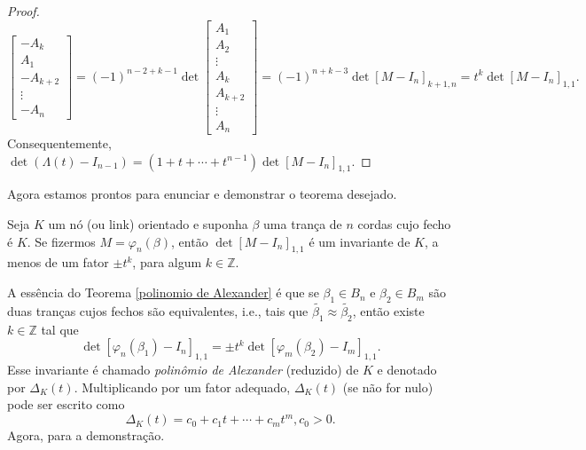 \begin{proof}
\begin{equation*}
\begin{bmatrix}
    		-A_k\\
    		A_1\\
    		-A_{k+2}\\
    		\vdots\\
    		-A_n
    		\end{bmatrix} = (-1)^{n-2+k-1}\det\begin{bmatrix}
    		A_1\\
    		A_2\\
    		\vdots\\
    		A_k\\
    		A_{k+2}\\
    		\vdots\\
    		A_n
    		\end{bmatrix} = (-1)^{n+k-3}\det[M - I_n]_{k+1, n} = t^k\det[M - I_n]_{1,1}.
		\end{equation*}
		Consequentemente, $\det(\Lambda(t) - I_{n-1}) = (1+t+\cdots+t^{n-1})\det[M - I_n]_{1,1}$.	
	\end{proof}
	Agora estamos prontos para enunciar e demonstrar o teorema desejado.
	\begin{theorem}
	\label{polinomio de Alexander}
		Seja $K$ um nó (ou link) orientado e suponha $\beta$ uma trança de $n$ cordas cujo fecho é $K$. 
		Se fizermos $M = \varphi_n(\beta)$, então $\det[M - I_n]_{1,1}$ é um invariante de $K$, 
		a menos de um fator $\pm t^k$, para algum $k\in\mathbb{Z}$.
	\end{theorem}
	A essência do Teorema \ref{polinomio de Alexander} é que se $\beta_1\in B_n$ e $\beta_2\in B_m$ 
	são duas tranças cujos fechos são equivalentes, i.e., tais que
	$\widetilde{\beta_1}\approx\widetilde{\beta_2}$, então existe $k\in\mathbb{Z}$ tal que
	\begin{equation*}
	    \det[\varphi_n(\beta_1) - I_n]_{1,1}=\pm t^k\det[\varphi_m(\beta_2) - I_m]_{1,1}.
	\end{equation*}
	Esse invariante é chamado \textit{polinômio de Alexander} (reduzido) de $K$ e denotado por $\Delta_K(t)$.
	Multiplicando por um fator adequado, $\Delta_K(t)$ (se não for nulo) pode ser escrito como
	\begin{equation*}
	    \Delta_K(t) = c_0 + c_1t + \cdots + c_mt^m, c_0>0.
	\end{equation*}
	Agora, para a demonstração.
